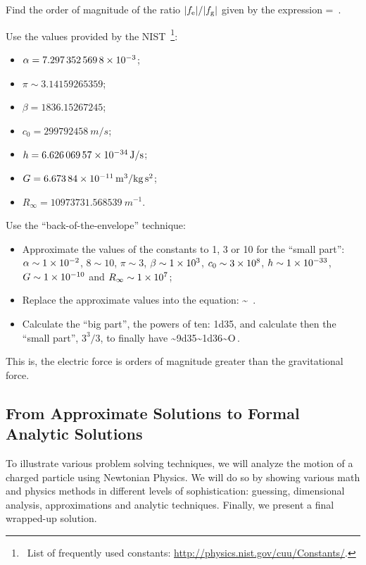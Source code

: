 \begin{approximation}
Find the order of magnitude of the ratio $\lvert{f_\text{e}}\rvert/\lvert{f_\text{g}}\rvert$ given by the expression
\beq
{} = \,.
\eeq

Use the values provided by the NIST~\footnote{~List of frequently used constants: \url{http://physics.nist.gov/cuu/Constants/}.}:
%
\begin{multicols}{2}
\begin{itemize}
\item $\alpha = \num{7.297 352 5698d-3}$;
\item $   \pi \sim\num{3.14159 26535 9}$;
\item $ \beta = \num{1836.152 672 45}$;
\item $c_0 = \SI{299 792 458}{m/s}$;
\item $  h = \SI{6.626 069 57d-34}{J/s}$;
\item $  G = \SI{6.673 84d-11}{m^3/kg.s^2}$;
\item $R_\infty = \SI{10 973 731.568 539}{m^{-1}}$.
\end{itemize}
\end{multicols}
%

Use the ``back-of-the-envelope'' technique:
\begin{itemize}
%
\item Approximate the values of the constants to 1, 3 or 10 for the ``small part'': $\alpha \sim \num{1d-2}$, $8\sim 10$, $\pi\sim 3$, $\beta \sim \num{1d3}$, $c_0 \sim \num{3d8}$, $h \sim \num{1d-33}$, $G \sim \num{1d-10}$ and $R_\infty \sim \num{1d7}$;
%
\item Replace the approximate values into the equation:
\beq
{} \sim 
{}\,.
\eeq
%
\item Calculate the ``big part'', the powers of ten: \num{1d35}, and calculate then the ``small part'', $3^3/3$, to finally have
\beq
{}\sim \num{9d35}\sim \num{1d36}\sim O\,.
\eeq
%
\end{itemize}

This is, the electric force is  orders of magnitude greater than the gravitational force.
\end{approximation}


\subsection{From Approximate Solutions to Formal Analytic Solutions}
To illustrate various problem solving techniques, we will analyze the motion of a charged particle using Newtonian Physics. We will do so by showing various math and physics methods in different levels of sophistication: guessing, dimensional analysis, approximations and analytic techniques. Finally, we present a final wrapped-up solution.

